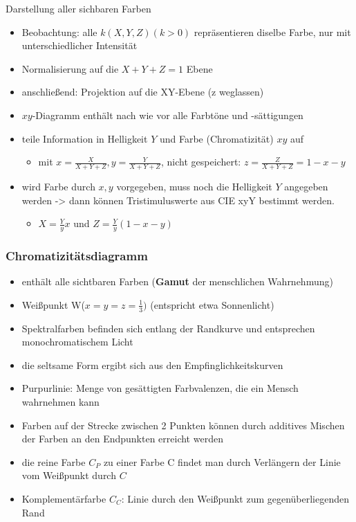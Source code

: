 \documentclass[paper=a4, fontsize=11pt]{scrartcl} %
\numberwithin{equation}{section} %
\numberwithin{figure}{section} %
\numberwithin{table}{section} %
\begin{document}
Darstellung aller sichbaren Farben
\begin{itemize}
\item Beobachtung: alle $k(X,Y,Z) (k>0)$ repräsentieren diselbe Farbe, nur mit unterschiedlicher Intensität
\item Normalisierung auf die $X+Y+Z=1$ Ebene
\item anschließend: Projektion auf die XY-Ebene (z weglassen)
\item $xy$-Diagramm enthält nach wie vor alle Farbtöne und -sättigungen
\item teile Information in Helligkeit $Y$ und Farbe (Chromatizität) $xy$ auf
\begin{itemize}
\item mit $x=\frac{X}{X+Y+Z}, y = \frac{Y}{X+Y+Z}$, nicht gespeichert: $z = \frac{Z}{X+Y+Z} = 1-x-y$
\end{itemize}
\item wird Farbe durch $x,y$ vorgegeben, muss noch die Helligkeit $Y$ angegeben werden -> dann können Tristimuluswerte aus CIE xyY bestimmt werden.
\begin{itemize}
\item $X = \frac{Y}{y}x$ und $Z = \frac{Y}{y}(1-x-y)$
\end{itemize}
\end{itemize}

\subsubsection{Chromatizitätsdiagramm}

\begin{itemize}
\item enthält alle sichtbaren Farben (\textbf{Gamut} der menschlichen Wahrnehmung)
\item Weißpunkt W($x=y=z=\frac{1}{3})$ (entspricht etwa Sonnenlicht)
\item Spektralfarben befinden sich entlang der Randkurve und entsprechen monochromatischem Licht
\item die seltsame Form ergibt sich aus den Empfinglichkeitskurven
\item Purpurlinie: Menge von gesättigten Farbvalenzen, die ein Mensch wahrnehmen kann
\item Farben auf der Strecke zwischen 2 Punkten können durch additives Mischen der Farben an den Endpunkten erreicht werden
\item die reine Farbe $C_P$ zu einer Farbe C findet man durch Verlängern der Linie vom Weißpunkt durch $C$
\item Komplementärfarbe $C_C$: Linie durch den Weißpunkt zum gegenüberliegenden Rand
\end{itemize}
\end{document}
